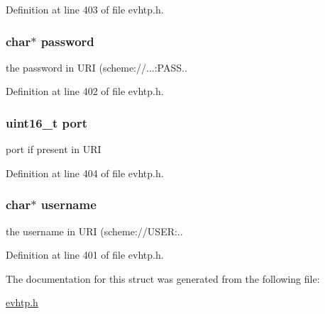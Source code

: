 Definition at line 403 of file evhtp.\-h.

\hypertarget{structevhtp__authority__s_a59460a3ff2c12443d1022e5cc0fba85c}{
\subsubsection[{password}]{\setlength{\rightskip}{0pt plus 5cm}char$\ast$ password}}\label{structevhtp__authority__s_a59460a3ff2c12443d1022e5cc0fba85c}
the password in U\-R\-I (scheme\-://...\-:P\-A\-S\-S.. 

Definition at line 402 of file evhtp.\-h.

\hypertarget{structevhtp__authority__s_a8e0798404bf2cf5dabb84c5ba9a4f236}{
\subsubsection[{port}]{\setlength{\rightskip}{0pt plus 5cm}uint16\-\_\-t port}}\label{structevhtp__authority__s_a8e0798404bf2cf5dabb84c5ba9a4f236}
port if present in U\-R\-I 

Definition at line 404 of file evhtp.\-h.

\hypertarget{structevhtp__authority__s_a9b20c006bd90a09e1465fb668700e81d}{
\subsubsection[{username}]{\setlength{\rightskip}{0pt plus 5cm}char$\ast$ username}}\label{structevhtp__authority__s_a9b20c006bd90a09e1465fb668700e81d}
the username in U\-R\-I (scheme\-://\-U\-S\-E\-R\-:.. 

Definition at line 401 of file evhtp.\-h.



The documentation for this struct was generated from the following file\-:\begin{DoxyCompactItemize}
\item 
\hyperlink{evhtp_8h}{evhtp.\-h}\end{DoxyCompactItemize}
